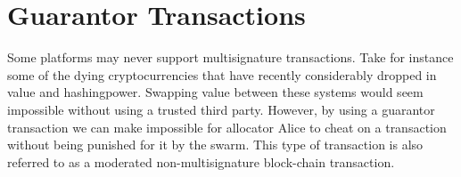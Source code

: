 \documentclass[11pt, a4paper]{article}
\newcommand{\crypt}[1]{\ensuremath{ {\lbrace {#1} \rbrace} } }
\begin{document}
% 
% 
% 
% 
% 
% 
% 
% 
% 
% 
% 
% 


\section{Guarantor Transactions}

Some platforms may never support multisignature transactions. Take for instance some of the dying cryptocurrencies that have recently considerably dropped in value and hashingpower. Swapping value between these systems would seem impossible without using a trusted third party. However, by using a guarantor transaction we can make impossible for allocator Alice to cheat on a transaction without being punished for it by the swarm. This type of transaction is also referred to as a moderated non-multisignature block-chain transaction.
\end{document}
